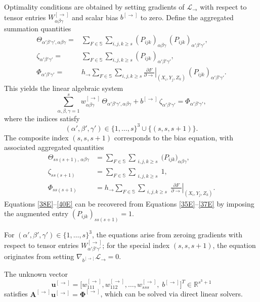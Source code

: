 \documentclass[pdflatex,sn-mathphys-num]{sn-jnl}%
\theoremstyle{thmstyleone}%
\theoremstyle{thmstyletwo}%
\theoremstyle{thmstylethree}%
\begin{document}
{Optimality conditions are obtained by setting gradients of $\mathcal L_{\to}$ with respect to tensor entries $W^{[\to]}_{\alpha\beta\gamma}$ and scalar bias $b^{[\to]}$ to zero. Define the aggregated summation quantities
\begin{align}
\Theta_{\alpha'\beta'\gamma',\alpha\beta\gamma}
=&\sum_{F\in\mathbb S}\sum_{i,j,k\ge s}
(P_{ijk})_{\alpha\beta\gamma}\,(P_{ijk})_{\alpha'\beta'\gamma'}, \label{35E} \\
\zeta_{\alpha'\beta'\gamma'}
=&\sum_{F\in\mathbb S}\sum_{i,j,k\ge s}
(P_{ijk})_{\alpha'\beta'\gamma'},\\
\Phi_{\alpha'\beta'\gamma'}
=& h_{\to}\sum_{F\in\mathbb S}\sum_{i,j,k\ge s}
\left.\frac{\partial F}{\partial\to}\right|_{(X_i,Y_j,Z_k)}
\,(P_{ijk})_{\alpha'\beta'\gamma'}. \label{37E}
 \end{align}
This yields the linear algebraic system
\[
\sum_{\alpha,\beta,\gamma=1}^{s} w^{[\to]}_{\alpha\beta\gamma}\,\Theta_{\alpha'\beta'\gamma',\alpha\beta\gamma}
+ b^{[\to]}\,\zeta_{\alpha'\beta'\gamma'}
=\Phi_{\alpha'\beta'\gamma'},
\]
where the indices satisfy
\[
(\alpha',\beta',\gamma') \in \{1,\dots,s\}^3 \cup \{(s,s,s+1)\}.
\]
The composite index $(s,s,s+1)$ corresponds to the bias equation, with associated aggregated quantities 
\begin{align}
 \Theta_{ss(s+1),\,\alpha\beta\gamma} &= \sum_{F\in\mathbb S}\sum_{\substack{i,j,k\ge s}} \big(P_{ijk}\big)_{\alpha\beta\gamma},\label{38E} \\
 \zeta_{ss(s+1)} &= \sum_{F\in\mathbb S}\sum_{\substack{i,j,k\ge s}} 1, \\
 \Phi_{ss(s+1)} &= h_{\to}\sum_{F\in\mathbb S}\sum_{\substack{i,j,k\ge s}} \left.\frac{\partial F}{\partial \to}\right|_{(X_i,Y_j,Z_k)}.\label{40E}
 \end{align}
  Equations \eqref{38E}--\eqref{40E} can be recovered from Equations  \eqref{35E}--\eqref{37E} by imposing the augmented entry $(P_{ijk})_{ss(s+1)}=1.$
 
For $(\alpha',\beta',\gamma') \in \{1,\dots,s\}^3$, the equations arise from zeroing gradients with respect to tensor entries $W^{[\to]}_{\alpha'\beta'\gamma'}$;
for the special index $(s,s,s+1)$, the equation originates from setting $\nabla_{b^{[\to]}}\mathcal{L}_{\to}=0$.



The unknown vector
\[
\boldsymbol u^{[\to]}=\big[w^{[\to]}_{111},w^{[\to]}_{112},\dots,w^{[\to]}_{sss},\; b^{[\to]}\big]^T\in\mathbb R^{s^3+1}
\]
satisfies $\boldsymbol A^{[\to]}\boldsymbol u^{[\to]}=\boldsymbol\Phi^{[\to]}$, which can be solved via direct linear solvers.



}
\end{document}
